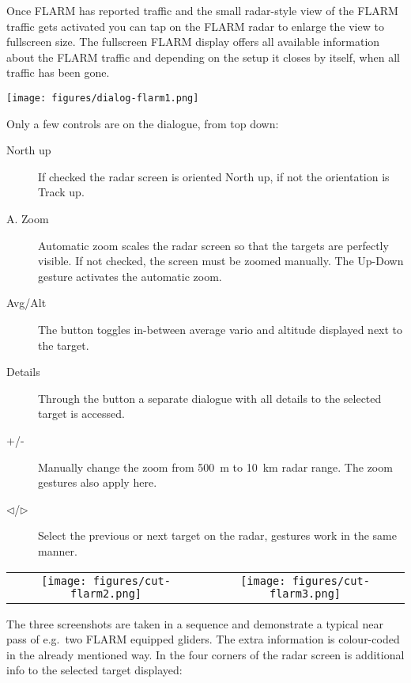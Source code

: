 Once FLARM has reported traffic and the small radar-style view of the FLARM
traffic gets activated   you can tap on the FLARM radar to
enlarge the view to fullscreen size.  
The fullscreen FLARM display offers all available information
about the FLARM traffic and depending on the setup it closes by itself, when all
traffic has been gone.

\begin{center}
\texttt{[image: figures/dialog-flarm1.png]}
\end{center}

Only a few controls are on the dialogue, from top down:
\begin{description}
\item[North up]  If checked the radar screen is oriented North up, if not the
orientation is Track up.
\item[A. Zoom]   Automatic zoom scales the radar screen so
that the targets are perfectly visible. If not checked, the screen must be
zoomed manually. The Up-Down gesture activates the automatic zoom. 
\item[Avg/Alt]   The button toggles in-between average
vario and altitude displayed next to the target.
\item[Details]   Through the button a separate dialogue with
all details to the selected target is accessed. 
\item[+/-]   Manually change the zoom from 500~m to
10~km radar range. The zoom gestures also apply here.
\item[$\triangleleft$/$\triangleright$]   Select the
previous or next target on the radar, gestures work in the same manner.
\end{description}

\begin{center}
\begin{tabular}{c c}
\texttt{[image: figures/cut-flarm2.png]}&
\texttt{[image: figures/cut-flarm3.png]}\\
\end{tabular}
\end{center}
The three screenshots are taken in a sequence and demonstrate a typical near
pass of e.g.\ two FLARM equipped gliders. The extra information is colour-coded
in the already mentioned way. In the four corners of the radar screen is
additional info to the selected target displayed:


